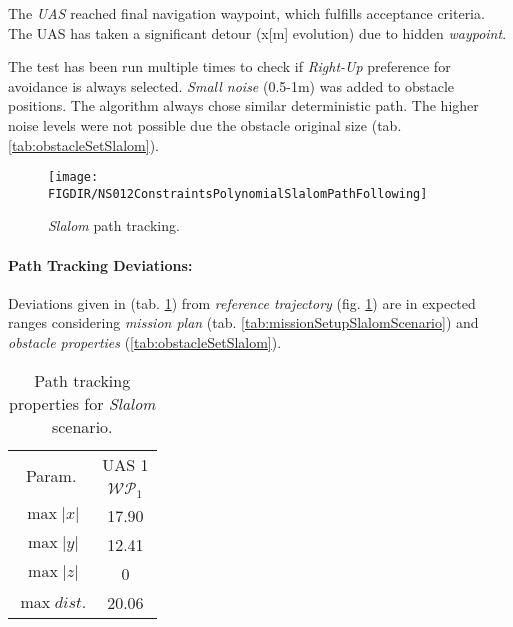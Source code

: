 The \emph{UAS} reached final navigation waypoint, which fulfills acceptance criteria. The UAS has taken a significant detour (x[m] evolution) due to hidden \emph{waypoint}. 

The test has been run multiple times to check if \emph{Right-Up} preference for avoidance is always selected. \emph{Small noise} (0.5-1m) was added to obstacle positions. The algorithm always chose similar deterministic path. The higher noise levels were not possible due the obstacle original size (tab. \ref{tab:obstacleSetSlalom}).

\begin{figure}[H]
    \centering
    \texttt{[image: \\FIGDIR/NS012ConstraintsPolynomialSlalomPathFollowing]} 
    \caption{\emph{Slalom} path tracking.}
    \label{fig:testCaseSlalomPathTracking}
\end{figure}


\paragraph{Path Tracking Deviations:} Deviations given in (tab. \ref{tab:pathTrackingParametersForSlalomAvoidance}) from \emph{reference trajectory} (fig. \ref{fig:testCaseSlalomPathTracking}) are in expected ranges considering \emph{mission plan} (tab. \ref{tab:missionSetupSlalomScenario}) and \emph{obstacle properties} (\ref{tab:obstacleSetSlalom}).

\begin{table}[H]
    \centering
    \begin{tabular}{c||c}
        \multirow{2}{*}{Param.} & UAS 1\\\cline{2-2}
                        & $\mathscr{WP}_1$  \\\hline\hline
          $\max |x|$    & 17.90      \\\hline
          $\max |y|$    & 12.41    \\\hline
          $\max |z|$    & 0        \\\hline
          $\max dist.$  & 20.06   \\
    \end{tabular}
    \caption{Path tracking properties for \emph{Slalom} scenario.}
    \label{tab:pathTrackingParametersForSlalomAvoidance}
\end{table}




